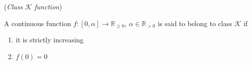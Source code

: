 \begin{bw_box}
\begin{definition}\cite{khalil_nonlinear_systems} (\textit{Class $\mathcal{K}$ function})

  A continuous function $f : [0, \alpha] \to \mathbb{R}_{\geq 0}$,
  $\alpha \in \mathbb{R}_{>0}$ is said to belong to class $\mathcal{K}$ if
  \begin{enumerate}
    \item it is strictly increasing
    \item $f(0) = 0$
  \end{enumerate}
  \label{def:k_class}
\end{definition}
\end{bw_box}
